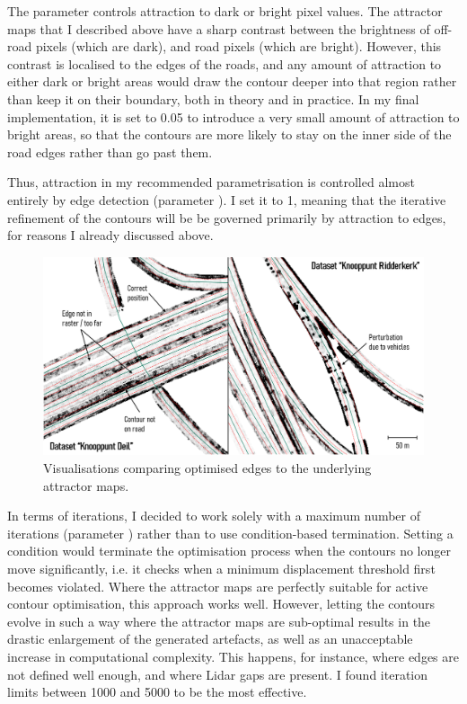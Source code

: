 The parameter  controls attraction to dark or bright pixel values. The attractor maps that I described above have a sharp contrast between the brightness of off-road pixels (which are dark), and road pixels (which are bright). However, this contrast is localised to the edges of the roads, and any amount of attraction to either dark or bright areas would draw the contour deeper into that region rather than keep it on their boundary, both in theory and in practice. In my final implementation, it is set to 0.05 to introduce a very small amount of attraction to bright areas, so that the contours are more likely to stay on the inner side of the road edges rather than go past them.

Thus, attraction in my recommended parametrisation is controlled almost entirely by edge detection (parameter ). I set it to 1, meaning that the iterative refinement of the contours will be be governed primarily by attraction to edges, for reasons I already discussed above.

\begin{figure}
    \centering
    \includegraphics[width=\linewidth]{final_report/figs/activecontouroptimisation1.png}
    \caption{Visualisations comparing optimised edges to the underlying attractor maps.}
    \label{fig:activecontouroptimisation1}
\end{figure}

In terms of iterations, I decided to work solely with a maximum number of iterations (parameter ) rather than to use condition-based termination. Setting a condition would terminate the optimisation process when the contours no longer move significantly, i.e. it checks when a minimum displacement threshold first becomes violated. Where the attractor maps are perfectly suitable for active contour optimisation, this approach works well. However, letting the contours evolve in such a way where the attractor maps are sub-optimal results in the drastic enlargement of the generated artefacts, as well as an unacceptable increase in computational complexity. This happens, for instance, where edges are not defined well enough, and where Lidar gaps are present. I found iteration limits between 1000 and 5000 to be the most effective.

